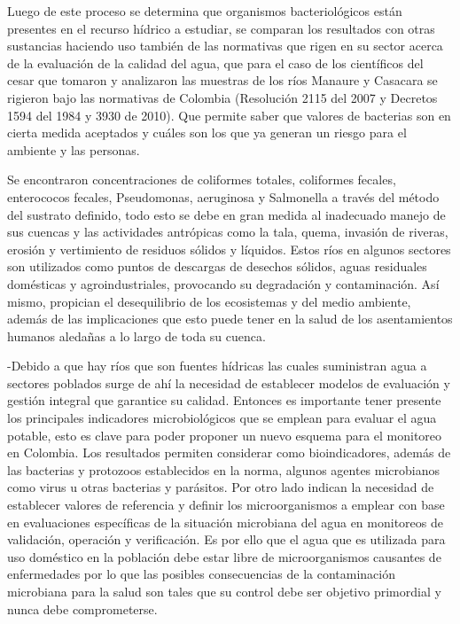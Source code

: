 Luego de este proceso se determina que organismos bacteriológicos están presentes en el recurso hídrico a estudiar, se comparan los resultados con otras sustancias haciendo uso también de las normativas que rigen en su sector acerca de la evaluación de la calidad del agua, que para el caso de los científicos del cesar que tomaron y analizaron las muestras de los ríos Manaure y Casacara se rigieron bajo las normativas de Colombia (Resolución 2115 del 2007 y Decretos 1594 del 1984 y 3930 de 2010). Que permite saber que valores de bacterias son en cierta medida aceptados y cuáles son los que ya generan un riesgo para el ambiente y las personas.

Se encontraron concentraciones de coliformes totales, coliformes fecales, enterococos fecales, Pseudomonas, aeruginosa y Salmonella a través del método del sustrato definido, todo esto se debe en gran medida al inadecuado manejo de sus cuencas y las actividades antrópicas como la tala, quema, invasión de riveras, erosión y vertimiento de residuos sólidos y líquidos. Estos ríos en algunos sectores son utilizados como puntos de descargas de desechos sólidos, aguas residuales domésticas y agroindustriales, provocando su degradación y contaminación. Así mismo, propician el desequilibrio de los ecosistemas y del medio ambiente, además de las implicaciones que esto puede tener en la salud de los asentamientos humanos aledañas a lo largo de toda su cuenca.

-Debido a que hay ríos que son fuentes hídricas las cuales suministran agua a sectores poblados surge de ahí la necesidad de establecer modelos de evaluación y gestión integral que garantice su calidad. Entonces es importante tener presente los principales indicadores microbiológicos que se emplean para evaluar el agua potable, esto es clave para poder proponer un nuevo esquema para el monitoreo en Colombia. Los resultados permiten considerar como bioindicadores, además de las bacterias y protozoos establecidos en la norma, algunos agentes microbianos como virus u otras bacterias y parásitos. Por otro lado indican la necesidad de establecer valores de referencia y definir los microorganismos a emplear con base en evaluaciones específicas de la situación microbiana del agua en monitoreos de validación, operación y verificación. Es por ello que el agua que es utilizada para uso doméstico en la población debe estar libre de microorganismos causantes de enfermedades por lo que las posibles consecuencias de la contaminación microbiana para la salud son tales que su control debe ser objetivo primordial y nunca debe comprometerse.

